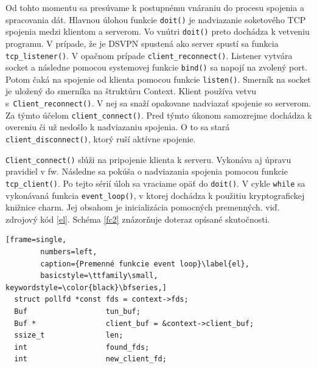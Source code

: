 Od tohto momentu sa presúvame k postupnému vnáraniu do procesu spojenia a spracovania dát. Hlavnou úlohou funkcie \lstinline|doit()| je nadviazanie soketového TCP spojenia medzi klientom a serverom. Vo vnútri \lstinline|doit()| preto dochádza k vetveniu programu. V prípade, že je DSVPN spustená ako server spustí sa funkcia \lstinline|tcp_listener()|. V opačnom prípade \lstinline|client_reconnect()|. Listener vytvára socket a následne pomocou systemovej funkcie \lstinline|bind()| sa napojí na zvolený port. Potom čaká na spojenie od klienta pomocou funkcie \lstinline|listen()|. Smerník na socket je uložený do smerníka na štruktúru Context.
Klient používa vetvu s~\lstinline|Client_reconnect()|. V nej sa snaží opakovane nadviazať spojenie so serverom. Za týmto účelom \lstinline|client_connect()|. Pred týmto úkonom samozrejme dochádza k overeniu či už nedošlo k nadviazaniu spojenia. O to sa stará \\\lstinline|client_disconnect()|, ktorý ruší aktívne spojenie.

\lstinline|Client_connect()| slúži na pripojenie klienta k serveru. Vykonáva aj úpravu pravidiel v \acrshort{fw}. Následne sa pokúša o nadviazania spojenia pomocou funkcie  \lstinline|tcp_client()|. Po tejto sérií úloh sa vraciame opäť do \lstinline|doit()|. V cykle \lstinline|while| sa vykonávaná funkcia \lstinline|event_loop()|, v ktorej dochádza k použitiu kryptografickej knižnice charm. Jej obsahom je inicializácia pomocných premenných. viď. zdrojový kód \ref{el}. Schéma \ref{fc2} znázorňuje doteraz opísané skutočnosti.
  
  \begin{minipage}{\linewidth} 	
  	\begin{lstlisting}[frame=single,
  		numbers=left,
  		caption={Premenné funkcie event loop}\label{el},
  		basicstyle=\ttfamily\small, keywordstyle=\color{black}\bfseries,]
  struct pollfd *const fds = context->fds;
  Buf                  tun_buf;
  Buf *                client_buf = &context->client_buf;
  ssize_t              len;
  int                  found_fds;
  int                  new_client_fd;
    	\end{lstlisting}
\end{minipage}\\ 
 
 


